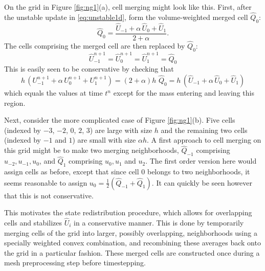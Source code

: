 On the grid in Figure \ref{fig:ng1}(a), cell merging might look like this.
First, after the unstable update in \eqref{eq:unstable1d}, form the 
volume-weighted merged cell $\widehat{Q}_0$:
\begin{equation}
\widehat{Q}_0 = \frac{\widehat{U}_{-1} + \alpha \,  \widehat{U}_0 + 
\widehat{U}_1}{2+\alpha} .
\end{equation}
The cells comprising the merged cell
are then replaced by $\widehat{Q}_0$:
\begin{equation}
\widehat{U}_{-1}^{n+1} = \widehat{U}_0^{n+1} = \widehat{U}_1^{n+1} =
\widehat{Q}_0
\end{equation}
This is easily seen to be conservative by checking that
\begin{equation}
h \, (U_{-1}^{n+1} + \alpha \, U_0^{n+1} + U_1^{n+1})
= (2+\alpha) h \,  \, \widehat{Q}_0 =
 h \, (\widehat{U}_{-1} + \alpha \, \widehat{U}_{0} +  \widehat{U}_{1})
\end{equation}
which equals the values at time $t^n$  except for the mass entering and
leaving this region.


Next, consider the more complicated case of Figure \ref{fig:ng1}(b).
Five cells (indexed by $-3$, $-2$, $0$, $2$, $3$) are large 
with size $h$ and the remaining two cells (indexed by $-1$ and $1$) 
are small with size $\alpha h$.
A first approach to cell merging on this grid
might be to make two merging neighborhoods, $\widehat{Q}_{-1}$
comprising $u_{-2},u_{-1},u_0$, and $\widehat{Q}_1$ comprising $u_0, u_1$ 
and $u_2$.
The first order version here would assign cells as before, except that
since cell 0 belongs to two neighborhoods, it seems  reasonable
to assign $u_0 = \frac{1}{2} (\widehat{Q}_{-1} + \widehat{Q}_1).$  
It can quickly be  seen however
that this is not conservative. 

This motivates the state redistribution
procedure, which allows for overlapping cells and stabilizes 
$\widehat{U}_i$ in a conservative manner.
This is done by temporarily merging cells of the grid into 
larger, possibly overlapping, neighborhoods using a specially weighted 
convex combination, and recombining these averages back onto the
grid in a particular fashion.  These merged cells are 
constructed once during a mesh preprocessing step before timestepping.

